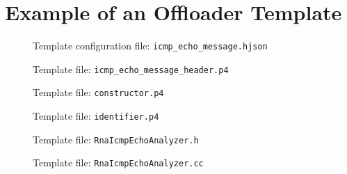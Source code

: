 \chapter{Example of an Offloader Template}
\label{cap:offloader_template}

\begin{figure}[htb]
    \centering
    \caption{Template configuration file: \texttt{icmp\_echo\_message.hjson}}
    
    \label{code:icmp_echo:config}
\end{figure}

\begin{figure}[htb]
    \centering
    \caption{Template file: \texttt{icmp\_echo\_message\_header.p4}}
    
    \label{code:icmp_echo:header}
\end{figure}

\begin{figure}[htb]
    \centering
    \caption{Template file: \texttt{constructor.p4}}
    
    \label{code:icmp_echo:constructor}
\end{figure}

\begin{figure}[htb]
    \centering
    \caption{Template file: \texttt{identifier.p4}}
    
    \label{code:icmp_echo:identifier}
\end{figure}

\begin{figure}[htb]
    \centering
    \caption{Template file: \texttt{RnaIcmpEchoAnalyzer.h}}
    
    \label{code:icmp_echo:analyzer_h}
\end{figure}

\begin{figure}[htb]
    \centering
    \caption{Template file: \texttt{RnaIcmpEchoAnalyzer.cc}}
    
    \label{code:icmp_echo:analyzer_cc}
\end{figure}

